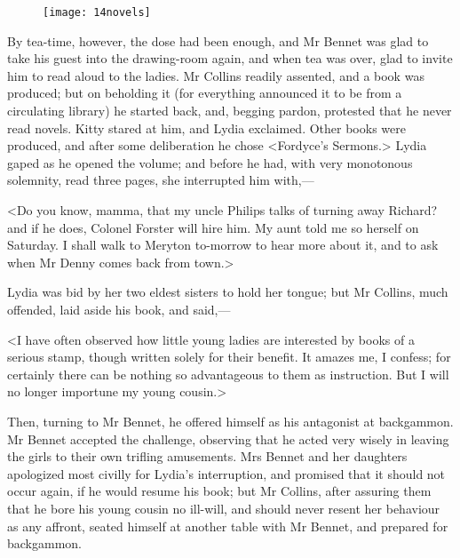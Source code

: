\begin{figure}[tbh]
\centering
\texttt{[image: 14novels]}
\end{figure}

By tea-time, however, the dose had been enough, and Mr Bennet was glad to take his guest into the drawing-room again, and when tea was over, glad to invite him to read aloud to the ladies. Mr Collins readily assented, and a book was produced; but on beholding it (for everything announced it to be from a circulating library) he started back, and, begging pardon, protested that he never read novels. Kitty stared at him, and Lydia exclaimed. Other books were produced, and after some deliberation he chose <Fordyce's Sermons.> Lydia gaped as he opened the volume; and before he had, with very monotonous solemnity, read three pages, she interrupted him with,—

<Do you know, mamma, that my uncle Philips talks of turning away Richard? and if he does, Colonel Forster will hire him. My aunt told me so herself on Saturday. I shall walk to Meryton to-morrow to hear more about it, and to ask when Mr Denny comes back from town.>

Lydia was bid by her two eldest sisters to hold her tongue; but Mr Collins, much offended, laid aside his book, and said,—

<I have often observed how little young ladies are interested by books of a serious stamp, though written solely for their benefit. It amazes me, I confess; for certainly there can be nothing so advantageous to them as instruction. But I will no longer importune my young cousin.>

Then, turning to Mr Bennet, he offered himself as his antagonist at backgammon. Mr Bennet accepted the challenge, observing that he acted very wisely in leaving the girls to their own trifling amusements. Mrs Bennet and her daughters apologized most civilly for Lydia's interruption, and promised that it should not occur again, if he would resume his book; but Mr Collins, after assuring them that he bore his young cousin no ill-will, and should never resent her behaviour as any affront, seated himself at another table with Mr Bennet, and prepared for backgammon.